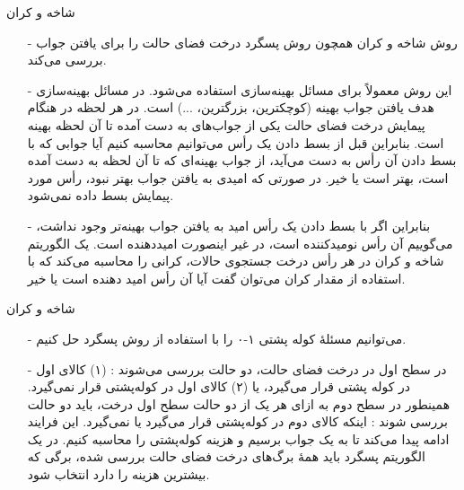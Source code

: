 \iffalse
\begin{frame}{شاخه و کران}
\begin{itemize}\itemr
\item[-]
روش شاخه و کران
\fn{1}{branch and bound}
برای بهبود الگوریتم‌های پسگرد به کار می‌روند.
\item[-]
روش شاخه و کران، همچون روش پسگرد درخت فضای حالت را برای یافتن جواب بررسی می‌کند.
\item[-]
یک الگوریتم شاخه و کران در هر رأس درخت جستجوی حالات،
کرانی را محاسبه می‌کند که با استفاده از مقدار کران می‌توان گفت آیا آن رأس
 امید دهنده است یا خیر. مقداری که به عنوان کران در هر رأس محاسبه می‌شود، با استفاده از کرانی بر روی جواب مسئله به دست می‌آید.
\end{itemize}
\end{frame}
\fi

\begin{frame}{شاخه و کران}
\begin{itemize}\itemr
\item[-]
روش شاخه و کران
 همچون روش پسگرد درخت فضای حالت را برای یافتن جواب بررسی می‌کند.
\item[-]
این روش معمولاً برای مسائل بهینه‌سازی استفاده می‌شود. در مسائل بهینه‌سازی هدف یافتن جواب بهینه (کوچکترین، بزرگترین، ...) است. در هر لحظه در هنگام پیمایش درخت فضای حالت یکی از جواب‌های به دست آمده تا آن لحظه بهینه است. بنابراین قبل از بسط دادن یک رأس می‌توانیم محاسبه کنیم آیا جوابی که با بسط دادن آن رأس به دست می‌آید، از جواب بهینه‌ای که تا آن لحظه به دست آمده است، بهتر است یا خیر. در صورتی که امیدی به یافتن جواب بهتر نبود، رأس مورد پیمایش بسط داده نمی‌شود.
\item[-]
بنابراین اگر با بسط دادن یک رأس امید به یافتن جواب بهینه‌تر وجود نداشت، می‌گوییم آن رأس نومیدکننده
است، در غیر اینصورت امیددهنده
است.
یک الگوریتم شاخه و کران در هر رأس درخت جستجوی حالات،
کرانی را محاسبه می‌کند که با استفاده از مقدار کران می‌توان گفت آیا آن رأس
 امید دهنده است یا خیر.
\end{itemize}
\end{frame}


\begin{frame}{شاخه و کران}
\begin{itemize}\itemr
\item[-]
می‌توانیم مسئلهٔ کوله پشتی ۱-۰ را با استفاده از روش پسگرد حل کنیم.
\item[-]
در سطح اول در درخت فضای حالت، دو حالت بررسی می‌شوند : (۱) کالای اول در کوله پشتی قرار می‌گیرد، یا (۲) کالای اول در کوله‌پشتی قرار نمی‌گیرد. همینطور در سطح دوم به ازای هر یک از دو حالت سطح اول درخت، باید دو حالت بررسی شوند : اینکه کالای دوم در کوله‌پشتی قرار می‌گیرد یا نمی‌گیرد.
این فرایند ادامه پیدا می‌کند تا به یک جواب برسیم و هزینه کوله‌پشتی را محاسبه کنیم. در یک الگوریتم پسگرد باید همهٔ برگ‌های درخت فضای حالت بررسی شده، برگی که بیشترین هزینه را دارد انتخاب شود. 
\end{itemize}
\end{frame}


